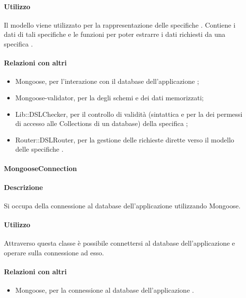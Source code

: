 \paragraph*{Utilizzo}
Il modello viene utilizzato per la rappresentazione delle specifiche . Contiene i dati di tali specifiche e le funzioni per poter estrarre i dati richiesti da una specifica .

\paragraph*{Relazioni con altri }
\begin{itemize}
\item Mongoose, per l'interazione con il database  dell'applicazione ;
\item Mongoose-validator, per la  degli schemi e dei dati memorizzati;
\item Lib::DSLChecker, per il controllo di validità (sintattica e per la  dei permessi di accesso alle Collections di un database) della specifica ;
\item Router::DSLRouter, per la gestione delle richieste dirette verso il modello delle specifiche .
\end{itemize}

\paragraph{MongooseConnection}
\paragraph*{Descrizione}

Si occupa della connessione al database  dell'applicazione utilizzando Mongoose.

\paragraph*{Utilizzo}
Attraverso questa classe è possibile connettersi al database  dell'applicazione e operare sulla connessione ad esso.

\paragraph*{Relazioni con altri }
\begin{itemize}
\item Mongoose, per la connessione al database  dell'applicazione .
\end{itemize}

